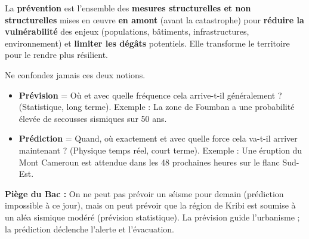 \documentclass[11pt]{article}
\begin{document}
\begin{definition}[Prévention]
La \textbf{prévention} est l'ensemble des \textbf{mesures structurelles et non structurelles} mises en œuvre \textbf{en amont} (avant la catastrophe) pour \textbf{réduire la vulnérabilité} des enjeux (populations, bâtiments, infrastructures, environnement) et \textbf{limiter les dégâts} potentiels. Elle transforme le territoire pour le rendre plus résilient.
\end{definition}

\begin{attention}
Ne confondez jamais ces deux notions.
\begin{itemize}
    \item \textbf{Prévision} = \og Où et avec quelle fréquence cela arrive-t-il généralement ? \fg (Statistique, long terme). Exemple : \og La zone de Foumban a une probabilité élevée de secousses sismiques sur 50 ans. \fg
    \item \textbf{Prédiction} = \og Quand, où exactement et avec quelle force cela va-t-il arriver maintenant ? \fg (Physique temps réel, court terme). Exemple : \og Une éruption du Mont Cameroun est attendue dans les 48 prochaines heures sur le flanc Sud-Est. \fg
\end{itemize}
\textbf{Piège du Bac :} On ne peut pas \og prévoir \fg un séisme pour demain (prédiction impossible à ce jour), mais on peut \og prévoir \fg que la région de Kribi est soumise à un aléa sismique modéré (prévision statistique). La prévision guide l'urbanisme ; la prédiction déclenche l'alerte et l'évacuation.
\end{attention}
\end{document}
